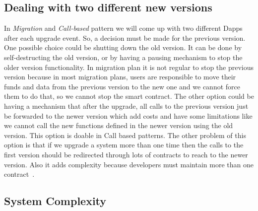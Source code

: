 \subsection{Dealing with two different new versions}
In \textit{Migration} and \textit{Call-based} pattern we will come up with two different Dapps after each upgrade event. So, a decision must be made for the previous version. One possible choice could be shutting down the old version. It can be done by self-destructing the old version, or by having a pausing mechanism to stop the older version functionality. In migration plan it is not regular to stop the previous version because in most migration plans, users are responsible to move their funds and data from the previous version to the new one and we cannot force them to do that, so we cannot stop the smart contract. 
The other option could be having a mechanism that after the upgrade, all calls to the previous version just be forwarded to the newer version which add costs and have some limitations like we cannot call the new functions defined in the newer version using the old version. This option is doable in Call based patterns. The other problem of this option is that if we upgrade a system more than one time then the calls to the first version should be redirected through lots of contracts to reach to the newer version. Also it adds complexity because developers must maintain more than one contract~\cite{tobBlogPost}.


 \subsection{System Complexity} \label{sysComplexity}

